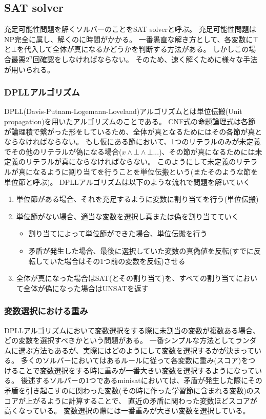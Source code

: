 \documentclass[titlepage]{jsarticle}
\begin{document}
\subsection{SAT solver}
充足可能性問題を解くソルバーのことをSAT solverと呼ぶ。
充足可能性問題はNP完全に属し、解くのに時間がかかる。%
一番愚直な解き方として、各変数に$\top$と$\bot$を代入して全体が真になるかどうかを判断する方法がある。
しかしこの場合最悪$2^n$回確認をしなければならない。
そのため、速く解くために様々な手法が用いられる。 



\subsubsection{DPLLアルゴリズム}
DPLL(Davis-Putnam-Logemann-Loveland)アルゴリズムとは単位伝搬(Unit propagation)を用いたアルゴリズムのことである。
CNF式の命題論理式は各節が論理積で繋がった形をしているため、全体が真となるためにはその各節が真とならなければならない。
もし仮にある節において、1つのリテラルのみが未定義でその他のリテラルが偽になる場合($x \land \bot \land \bot ...$)、その節が真になるためには未定義のリテラルが真にならなければならない。
このようにして未定義のリテラルが真になるように割り当てを行うことを単位伝搬という(またそのような節を単位節と呼ぶ)。
DPLLアルゴリズムは以下のような流れで問題を解いていく
\begin{enumerate}
	\item 単位節がある場合、それを充足するように変数に割り当てを行う(単位伝搬)
	\item 単位節がない場合、適当な変数を選択し真または偽を割り当てていく
	\begin{itemize}
		\item 割り当てによって単位節ができた場合、単位伝搬を行う
		\item 矛盾が発生した場合、最後に選択していた変数の真偽値を反転(すでに反転していた場合はその1つ前の変数を反転)させる
	\end{itemize}
	\item 全体が真になった場合はSAT(とその割り当て)を、すべての割り当てにおいて全体が偽になった場合はUNSATを返す
\end{enumerate}



\subsubsection{変数選択における重み}
DPLLアルゴリズムにおいて変数選択をする際に未割当の変数が複数ある場合、どの変数を選択すべきかという問題がある。
一番シンプルな方法としてランダムに選ぶ方法もあるが、実際にはどのようにして変数を選択するかが決まっている。
多くのソルバーにおいてはあるルールに従って各変数に重み(スコア)をつけることで変数選択をする時に重みが一番大きい変数を選択するようになっている。
後述するソルバーの1つであるminisatにおいては、矛盾が発生した際にその矛盾を引き起こすのに関わった変数(その時に作った学習節に含まれる変数)のスコアが上がるように計算することで、
直近の矛盾に関わった変数ほどスコアが高くなっている。
変数選択の際には一番重みが大きい変数を選択している。
\end{document}
